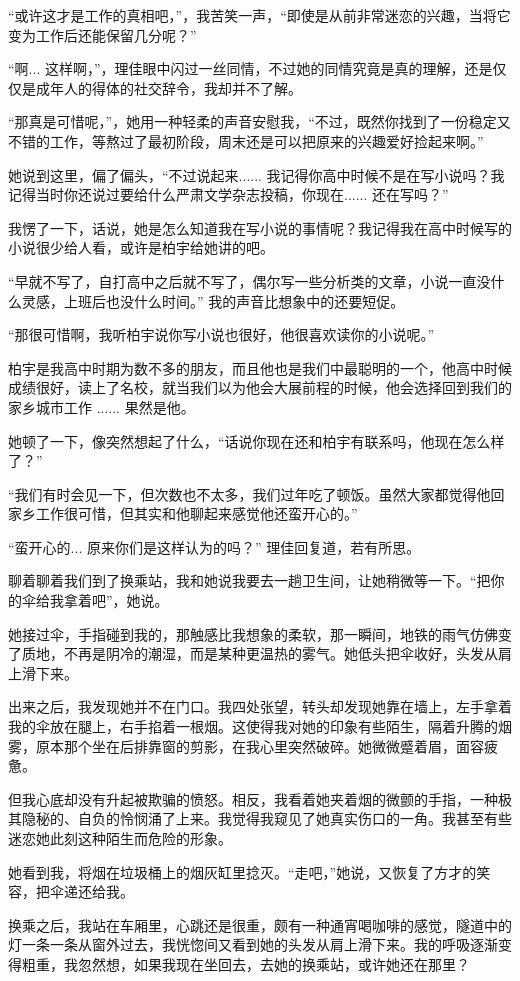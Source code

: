 “或许这才是工作的真相吧，”，我苦笑一声，“即使是从前非常迷恋的兴趣，当将它变为工作后还能保留几分呢？”

“啊... 这样啊，”，理佳眼中闪过一丝同情，不过她的同情究竟是真的理解，还是仅仅是成年人的得体的社交辞令，我却并不了解。

“那真是可惜呢，”，她用一种轻柔的声音安慰我，“不过，既然你找到了一份稳定又不错的工作，等熬过了最初阶段，周末还是可以把原来的兴趣爱好捡起来啊。”

她说到这里，偏了偏头，“不过说起来...... 我记得你高中时候不是在写小说吗？我记得当时你还说过要给什么严肃文学杂志投稿，你现在...... 还在写吗？”

我愣了一下，话说，她是怎么知道我在写小说的事情呢？我记得我在高中时候写的小说很少给人看，或许是柏宇给她讲的吧。

“早就不写了，自打高中之后就不写了，偶尔写一些分析类的文章，小说一直没什么灵感，上班后也没什么时间。” 我的声音比想象中的还要短促。

“那很可惜啊，我听柏宇说你写小说也很好，他很喜欢读你的小说呢。”

柏宇是我高中时期为数不多的朋友，而且他也是我们中最聪明的一个，他高中时候成绩很好，读上了名校，就当我们以为他会大展前程的时候，他会选择回到我们的家乡城市工作 ...... 果然是他。

她顿了一下，像突然想起了什么，“话说你现在还和柏宇有联系吗，他现在怎么样了？”

“我们有时会见一下，但次数也不太多，我们过年吃了顿饭。虽然大家都觉得他回家乡工作很可惜，但其实和他聊起来感觉他还蛮开心的。”

“蛮开心的... 原来你们是这样认为的吗？” 理佳回复道，若有所思。

聊着聊着我们到了换乘站，我和她说我要去一趟卫生间，让她稍微等一下。“把你的伞给我拿着吧”，她说。

她接过伞，手指碰到我的，那触感比我想象的柔软，那一瞬间，地铁的雨气仿佛变了质地，不再是阴冷的潮湿，而是某种更温热的雾气。她低头把伞收好，头发从肩上滑下来。

出来之后，我发现她并不在门口。我四处张望，转头却发现她靠在墙上，左手拿着我的伞放在腿上，右手掐着一根烟。这使得我对她的印象有些陌生，隔着升腾的烟雾，原本那个坐在后排靠窗的剪影，在我心里突然破碎。她微微蹙着眉，面容疲惫。

但我心底却没有升起被欺骗的愤怒。相反，我看着她夹着烟的微颤的手指，一种极其隐秘的、自负的怜悯涌了上来。我觉得我窥见了她真实伤口的一角。我甚至有些迷恋她此刻这种陌生而危险的形象。

她看到我，将烟在垃圾桶上的烟灰缸里捻灭。“走吧，”她说，又恢复了方才的笑容，把伞递还给我。

换乘之后，我站在车厢里，心跳还是很重，颇有一种通宵喝咖啡的感觉，隧道中的灯一条一条从窗外过去，我恍惚间又看到她的头发从肩上滑下来。我的呼吸逐渐变得粗重，我忽然想，如果我现在坐回去，去她的换乘站，或许她还在那里？
